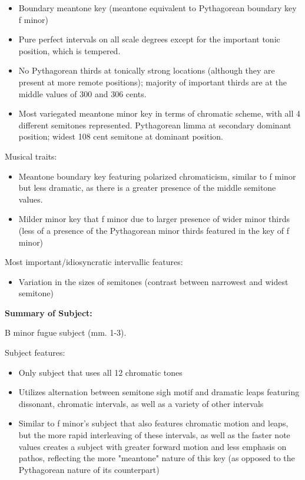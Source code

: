\begin{itemize}
\tightlist
\item
  Boundary meantone key (meantone equivalent to Pythagorean boundary key
  f minor)
\item
  Pure perfect intervals on all scale degrees except for the important
  tonic position, which is tempered.
\item
  No Pythagorean thirds at tonically strong locations (although they are
  present at more remote positions); majority of important thirds are at
  the middle values of 300 and 306 cents.
\item
  Most variegated meantone minor key in terms of chromatic scheme, with
  all 4 different semitones represented. Pythagorean limma at secondary
  dominant position; widest 108 cent semitone at dominant position.
\end{itemize}

Musical traits:

\begin{itemize}
\tightlist
\item
  Meantone boundary key featuring polarized chromaticism, similar to f
  minor but less dramatic, as there is a greater presence of the middle
  semitone values.
\item
  Milder minor key that f minor due to larger presence of wider minor
  thirds (less of a presence of the Pythagorean minor thirds featured in
  the key of f minor)
\end{itemize}

Most important/idiosyncratic intervallic features:

\begin{itemize}
\tightlist
\item
  Variation in the sizes of semitones (contrast between narrowest and
  widest semitone)
\end{itemize}

\textbf{Summary of Subject:}



\begin{Example}[H]
\vspace{1.5em}
    \centering
    \caption{ B minor fugue subject (mm. 1-3). }
\end{Example}    
    Subject features:

\begin{itemize}
\tightlist
\item
  Only subject that uses all 12 chromatic tones
\item
  Utilizes alternation between semitone sigh motif and dramatic leaps
  featuring dissonant, chromatic intervals, as well as a variety of
  other intervals
\item
  Similar to f minor's subject that also features chromatic motion and
  leaps, but the more rapid interleaving of these intervals, as well as
  the faster note values creates a subject with greater forward motion
  and less emphasis on pathos, reflecting the more "meantone" nature of
  this key (as opposed to the Pythagorean nature of its counterpart)
\end{itemize}

